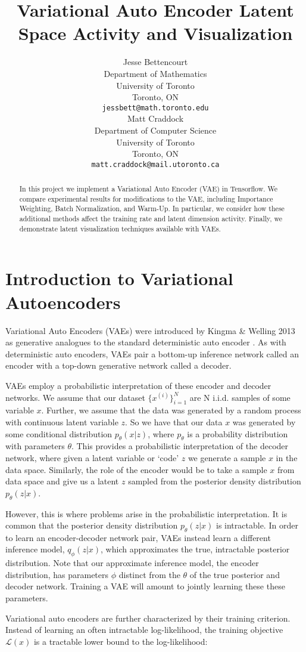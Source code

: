 \documentclass{article} %
\title{Variational Auto Encoder Latent Space Activity and Visualization}
\author{
Jesse Bettencourt\\
Department of Mathematics\\
University of Toronto\\
Toronto, ON \\
\texttt{jessbett@math.toronto.edu} \\
\And
Matt Craddock\\
Department of Computer Science\\
University of Toronto\\
Toronto, ON \\
\texttt{matt.craddock@mail.utoronto.ca} \\
}
\renewcommand{\L}{\mathcal{L}}
\begin{document}
\maketitle

\begin{abstract}
In this project we implement a Variational Auto Encoder (VAE) in Tensorflow. We compare experimental results for modifications to the VAE, including Importance Weighting, Batch Normalization, and Warm-Up. In particular, we consider how these additional methods affect the training rate and latent dimension activity. Finally, we demonstrate latent visualization techniques available with VAEs.
\end{abstract}

\section{Introduction to Variational Autoencoders}

Variational Auto Encoders (VAEs) were introduced by Kingma \& Welling 2013 as generative analogues to the standard deterministic auto encoder \cite{Kingma2013}. As with deterministic auto encoders, VAEs pair a bottom-up inference network called an encoder with a top-down generative network called a decoder. 
\par VAEs employ a probabilistic interpretation of these encoder and decoder networks. We assume that our dataset $\{x^{(i)}\}_{i=1}^N$ are N i.i.d. samples of some variable $x$. Further, we assume that the data was generated by a random process with continuous latent variable $z$. So we have that our data $x$ was generated by some conditional distribution $p_\theta(x|z)$, where $p_\theta$ is a probability distribution with parameters $\theta$. This provides a probabilistic interpretation of the decoder network, where given a latent variable or `code' $z$ we generate a sample $x$ in the data space. Similarly, the role of the encoder would be to take a sample $x$ from data space and give us a latent $z$ sampled from the posterior density distribution $p_\theta(z|x)$. 
\par However, this is where problems arise in the probabilistic interpretation. It is common that the posterior density distribution $p_\theta(z|x)$ is intractable. In order to learn an encoder-decoder network pair, VAEs instead learn a different inference model, $q_\phi(z|x)$, which approximates the true, intractable posterior distribution. Note that our approximate inference model, the encoder distribution, has parameters $\phi$ distinct from the $\theta$ of the true posterior and decoder network. Training a VAE will amount to jointly learning these these parameters.
\par Variational auto encoders are further characterized by their training criterion. Instead of learning an often intractable log-likelihood, the training objective $\L(x)$ is a tractable lower bound to the log-likelihood:
\end{document}

